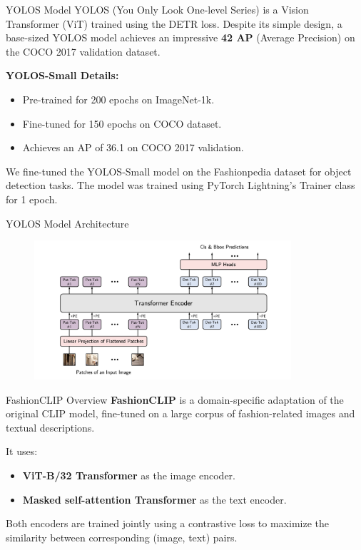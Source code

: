 \begin{frame}{YOLOS Model}
  \small
  YOLOS (You Only Look One-level Series) is a Vision Transformer (ViT) trained using the DETR loss. Despite its simple design, a base-sized YOLOS model achieves an impressive \textbf{42 AP} (Average Precision) on the COCO 2017 validation dataset.
  \normalsize
  \vspace{0.5em}

  \textbf{YOLOS-Small Details:}
  \begin{itemize}
  \item Pre-trained for 200 epochs on ImageNet-1k.
  \item Fine-tuned for 150 epochs on COCO dataset.
  \item Achieves an AP of 36.1 on COCO 2017 validation.
\end{itemize}
\vspace{0.5em}
\small
We fine-tuned the YOLOS-Small model on the Fashionpedia dataset for object detection tasks. The model was trained using PyTorch Lightning’s Trainer class for 1 epoch.

\end{frame}

\begin{frame}{YOLOS Model Architecture}
\begin{figure}[H]
  \centering
  \includegraphics[width=0.85\textwidth]{images/yolos_architecture.png}
\end{figure}
\end{frame}

\begin{frame}{FashionCLIP Overview}
  \textbf{FashionCLIP} is a domain-specific adaptation of the original CLIP model, fine-tuned on a large corpus of fashion-related images and textual descriptions.

  \vspace{0.5em}

  It uses:
  \begin{itemize}
      \item \textbf{ViT-B/32 Transformer} as the image encoder.
      \item \textbf{Masked self-attention Transformer} as the text encoder.
  \end{itemize}

  Both encoders are trained jointly using a contrastive loss to maximize the similarity between corresponding (image, text) pairs.
  \end{frame}

